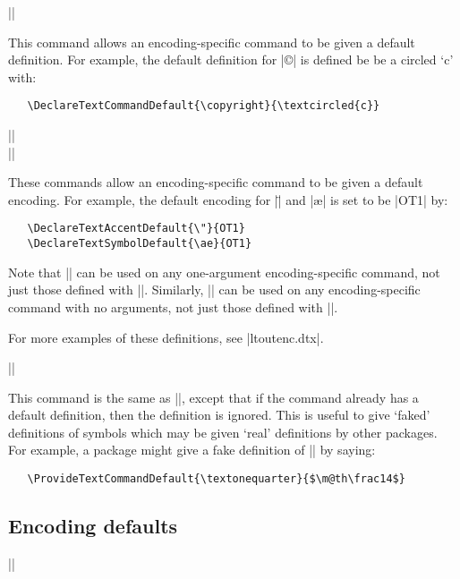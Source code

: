 \documentclass{ltxguide}[1995/11/28]
\begin{document}
\begin{decl}[1994/12/01]
   |\DeclareTextCommandDefault|  
\end{decl}
This command allows an encoding-specific command to be given a default 
definition.  For example, the default definition for |\copyright| is 
defined be be a circled `c' with:
\begin{verbatim}
   \DeclareTextCommandDefault{\copyright}{\textcircled{c}}
\end{verbatim}
\begin{decl}[1994/12/01]
   |\DeclareTextAccentDefault|   \\
   |\DeclareTextSymbolDefault|  
\end{decl}
These commands allow an encoding-specific command to be given a
default encoding.  For example, the default encoding for |\"| and
|\ae| is set to be |OT1| by:
\begin{verbatim}
   \DeclareTextAccentDefault{\"}{OT1}
   \DeclareTextSymbolDefault{\ae}{OT1}
\end{verbatim}
Note that |\DeclareTextAccentDefault| can be used on any one-argument
encoding-specific command, not just those defined with
|\DeclareTextAccent|.  Similarly, |\DeclareTextSymbolDefault| can be
used on any encoding-specific command with no arguments, not just
those defined with |\DeclareTextSymbol|.
 
For more examples of these definitions, see |ltoutenc.dtx|.  
 
\begin{decl}[1994/12/01]
   |\ProvideTextCommandDefault|  
\end{decl}
This command is the same as |\DeclareTextCommandDefault|, except that
if the command already has a default definition, then the definition
is ignored.  This is useful to give `faked' definitions of symbols
which may be given `real' definitions by other packages.  For example,
a package might give a fake definition of |\textonequarter| by saying:
\begin{verbatim}
   \ProvideTextCommandDefault{\textonequarter}{$\m@th\frac14$}
\end{verbatim}
 
 \subsection{Encoding defaults}
 
\begin{decl}
|\DeclareFontEncodingDefaults|  
\end{decl}
 
\end{document}

